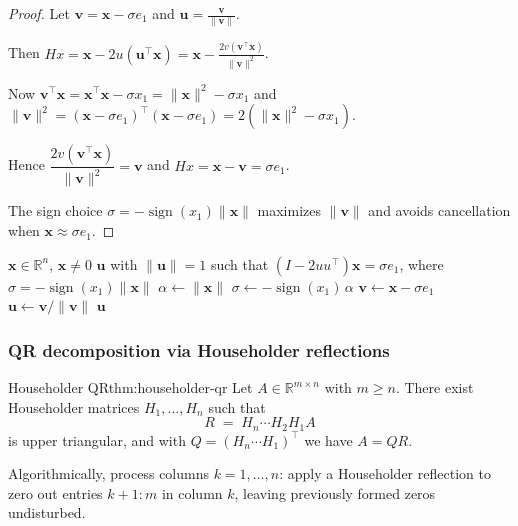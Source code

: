 \begin{proof}
    Let $\mathbf{v}=\mathbf{x}-\sigma e_1$ and $\mathbf{u}=\frac{\mathbf{v}}{\|\mathbf{v}\|}$.

    Then $Hx=\mathbf{x}-2u(\mathbf{u}^\top \mathbf{x}) = \mathbf{x} - \frac{2v(\mathbf{v}^\top \mathbf{x})}{\|\mathbf{v}\|^2}$.

    Now $\mathbf{v}^\top \mathbf{x} = \mathbf{x}^\top \mathbf{x} - \sigma x_1 = \|\mathbf{x}\|^2 - \sigma x_1$ and $\|\mathbf{v}\|^2 = (\mathbf{x}-\sigma e_1)^\top(\mathbf{x}-\sigma e_1)=2(\|\mathbf{x}\|^2-\sigma x_1)$.

    Hence $\dfrac{2v(\mathbf{v}^\top \mathbf{x})}{\|\mathbf{v}\|^2}=\mathbf{v}$ and $Hx=\mathbf{x}-\mathbf{v}=\sigma e_1$.

    The sign choice $\sigma=-\operatorname{sign}(x_1)\|\mathbf{x}\|$ maximizes $\|\mathbf{v}\|$ and avoids cancellation when $\mathbf{x}\approx \sigma e_1$.
\end{proof}


\begin{algorithm}[H]
    \caption{Householder vector (stable sign)}
    \begin{algorithmic}[1]
        \Require $\mathbf{x}\in\mathbb{R}^n$, $\mathbf{x}\neq 0$
        \Ensure $\mathbf{u}$ with $\|\mathbf{u}\|=1$ such that $(I-2uu^\top)\mathbf{x}=\sigma e_1$, where $\sigma=-\operatorname{sign}(x_1)\|\mathbf{x}\|$
        \State $\alpha \gets \|\mathbf{x}\|$
        \State $\sigma \gets -\operatorname{sign}(x_1)\,\alpha$ 
        \State $\mathbf{v} \gets \mathbf{x}-\sigma e_1$
        \State $\mathbf{u} \gets \mathbf{v}/\|\mathbf{v}\|$
        \State \Return $\mathbf{u}$
    \end{algorithmic}
\end{algorithm}

\subsubsection{QR decomposition via Householder reflections}

\begin{theorem}{Householder QR}{thm:householder-qr}
    Let $A\in\mathbb{R}^{m\times n}$ with $m\ge n$. There exist Householder matrices $H_1,\dots,H_n$ such that
    \[
        R \;=\; H_n\cdots H_2 H_1 A
    \]
    is upper triangular, and with $Q=(H_n\cdots H_1)^\top$ we have $A=QR$.
\end{theorem}

Algorithmically, process columns $k=1,\dots,n$: apply a Householder reflection to zero out entries $k+1{:}m$ in column $k$, leaving previously formed zeros undisturbed.

